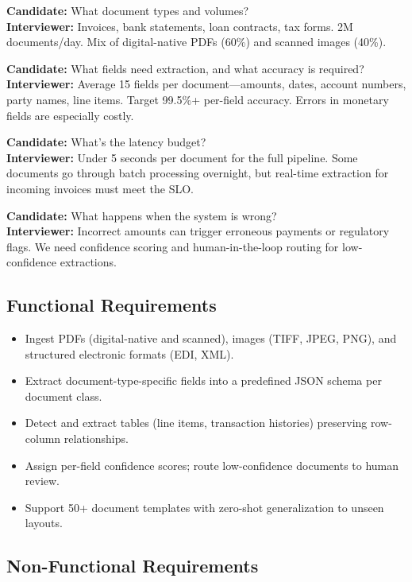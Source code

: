 \textbf{Candidate:} What document types and volumes?\\
\textbf{Interviewer:} Invoices, bank statements, loan contracts, tax forms. 2M documents/day. Mix of digital-native PDFs (60\%) and scanned images (40\%).

\textbf{Candidate:} What fields need extraction, and what accuracy is required?\\
\textbf{Interviewer:} Average 15 fields per document---amounts, dates, account numbers, party names, line items. Target 99.5\%+ per-field accuracy. Errors in monetary fields are especially costly.

\textbf{Candidate:} What's the latency budget?\\
\textbf{Interviewer:} Under 5 seconds per document for the full pipeline. Some documents go through batch processing overnight, but real-time extraction for incoming invoices must meet the SLO.

\textbf{Candidate:} What happens when the system is wrong?\\
\textbf{Interviewer:} Incorrect amounts can trigger erroneous payments or regulatory flags. We need confidence scoring and human-in-the-loop routing for low-confidence extractions.

\subsection*{Functional Requirements}

\begin{itemize}
  \item Ingest PDFs (digital-native and scanned), images (TIFF, JPEG, PNG), and structured electronic formats (EDI, XML).
  \item Extract document-type-specific fields into a predefined JSON schema per document class.
  \item Detect and extract tables (line items, transaction histories) preserving row-column relationships.
  \item Assign per-field confidence scores; route low-confidence documents to human review.
  \item Support 50+ document templates with zero-shot generalization to unseen layouts.
\end{itemize}

\subsection*{Non-Functional Requirements}

